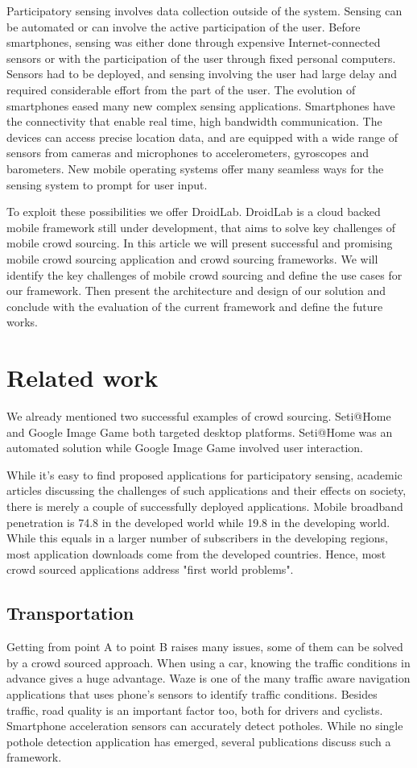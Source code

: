 \documentclass[conference,letterpaper]{IEEEtran}
\begin{document}
Participatory sensing involves data collection outside of the system. Sensing can be automated or can involve the active participation of the user. Before smartphones, sensing was either done through expensive Internet-connected sensors or with the participation of the user through fixed personal computers. Sensors had to be deployed, and sensing involving the user had large delay and required considerable effort from the part of the user. The evolution of smartphones eased many new complex sensing applications. Smartphones have the connectivity that enable real time, high bandwidth communication. The devices can access precise location data, and are equipped with a wide range of sensors from cameras and microphones to accelerometers, gyroscopes and barometers. New mobile operating systems offer many seamless ways for the sensing system to prompt for user input.

To exploit these possibilities we offer DroidLab. DroidLab is a cloud backed mobile framework still under development, that aims to solve key challenges of mobile crowd sourcing. In this article we will present successful and promising mobile crowd sourcing application and crowd sourcing frameworks. We will identify the key challenges of mobile crowd sourcing and define the use cases for our framework. Then present the architecture and design of our solution and conclude with the evaluation of the current framework and define the future works.

\section{Related work}
\label{sec:related_work}
We already mentioned two successful examples of crowd sourcing. Seti@Home and Google Image Game both targeted desktop platforms. Seti@Home was an automated solution while Google Image Game involved user interaction.

While it's easy to find proposed applications for participatory sensing, academic articles discussing the challenges of such applications and their effects on society, there is merely a couple of successfully deployed applications. Mobile broadband penetration is 74.8 in the developed world while 19.8 in the developing world. While this equals in a larger number of subscribers in the developing regions, most application downloads come from the developed countries. Hence, most crowd sourced applications address "first world problems".

\subsection{Transportation}
Getting from point A to point B raises many issues, some of them can be solved by a crowd sourced approach. When using a car, knowing the traffic conditions in advance gives a huge advantage. Waze is one of the many traffic aware navigation applications that uses phone's sensors to identify traffic conditions. Besides traffic, road quality is an important factor too, both for drivers and cyclists. Smartphone acceleration sensors can accurately detect potholes. While no single pothole detection application has emerged, several publications discuss such a framework.
\end{document}

